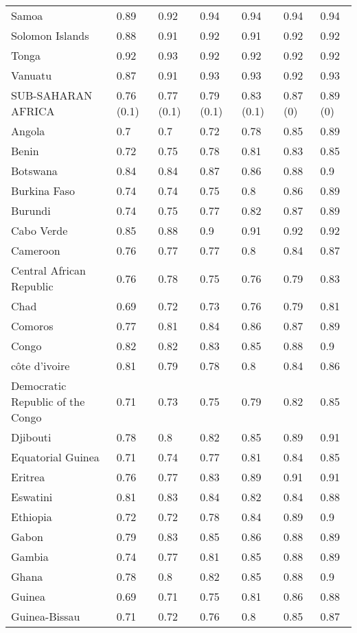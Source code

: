 \begin{longtable}[t]{lllllll}
Samoa & 0.89 & 0.92 & 0.94 & 0.94 & 0.94 & 0.94\\
Solomon Islands & 0.88 & 0.91 & 0.92 & 0.91 & 0.92 & 0.92\\
Tonga & 0.92 & 0.93 & 0.92 & 0.92 & 0.92 & 0.92\\
Vanuatu & 0.87 & 0.91 & 0.93 & 0.93 & 0.92 & 0.93\\
SUB-SAHARAN AFRICA & 0.76 (0.1) & 0.77 (0.1) & 0.79 (0.1) & 0.83 (0.1) & 0.87 (0) & 0.89 (0)\\
Angola & 0.7 & 0.7 & 0.72 & 0.78 & 0.85 & 0.89\\
Benin & 0.72 & 0.75 & 0.78 & 0.81 & 0.83 & 0.85\\
Botswana & 0.84 & 0.84 & 0.87 & 0.86 & 0.88 & 0.9\\
Burkina Faso & 0.74 & 0.74 & 0.75 & 0.8 & 0.86 & 0.89\\
Burundi & 0.74 & 0.75 & 0.77 & 0.82 & 0.87 & 0.89\\
Cabo Verde & 0.85 & 0.88 & 0.9 & 0.91 & 0.92 & 0.92\\
Cameroon & 0.76 & 0.77 & 0.77 & 0.8 & 0.84 & 0.87\\
Central African Republic & 0.76 & 0.78 & 0.75 & 0.76 & 0.79 & 0.83\\
Chad & 0.69 & 0.72 & 0.73 & 0.76 & 0.79 & 0.81\\
Comoros & 0.77 & 0.81 & 0.84 & 0.86 & 0.87 & 0.89\\
Congo & 0.82 & 0.82 & 0.83 & 0.85 & 0.88 & 0.9\\
côte d'ivoire & 0.81 & 0.79 & 0.78 & 0.8 & 0.84 & 0.86\\
Democratic Republic of the Congo & 0.71 & 0.73 & 0.75 & 0.79 & 0.82 & 0.85\\
Djibouti & 0.78 & 0.8 & 0.82 & 0.85 & 0.89 & 0.91\\
Equatorial Guinea & 0.71 & 0.74 & 0.77 & 0.81 & 0.84 & 0.85\\
Eritrea & 0.76 & 0.77 & 0.83 & 0.89 & 0.91 & 0.91\\
Eswatini & 0.81 & 0.83 & 0.84 & 0.82 & 0.84 & 0.88\\
Ethiopia & 0.72 & 0.72 & 0.78 & 0.84 & 0.89 & 0.9\\
Gabon & 0.79 & 0.83 & 0.85 & 0.86 & 0.88 & 0.89\\
Gambia & 0.74 & 0.77 & 0.81 & 0.85 & 0.88 & 0.89\\
Ghana & 0.78 & 0.8 & 0.82 & 0.85 & 0.88 & 0.9\\
Guinea & 0.69 & 0.71 & 0.75 & 0.81 & 0.86 & 0.88\\
Guinea-Bissau & 0.71 & 0.72 & 0.76 & 0.8 & 0.85 & 0.87\\

\end{longtable}

